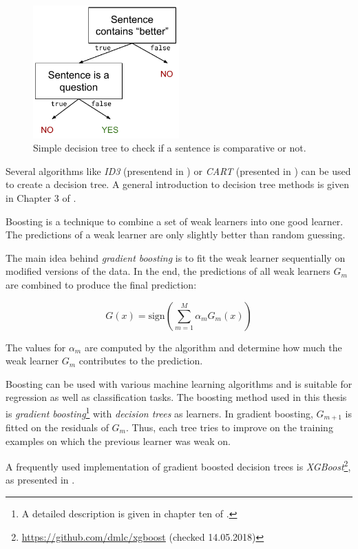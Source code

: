 \begin{figure}[ht]
\centering
	\includegraphics[width=0.5\textwidth]{images/dectree}
	\caption{Simple decision tree to check if a sentence is comparative or not.}
		\label{fig:dectree}
\end{figure}

Several algorithms like \emph{ID3} (presentend in \cite{quinlan1986induction}) or \emph{CART} (presented in \cite{breiman2017classification}) can be used to create a decision tree. A general introduction to decision tree methods is given in Chapter 3 of \cite{mitchell1997machine}.

Boosting is a technique to combine a set of weak learners into one good learner. The predictions of a weak learner are only slightly better than random guessing.

The main idea behind \emph{gradient boosting} is to fit the weak learner sequentially on modified versions of the data. In the end, the predictions of all weak learners \emph{$G_m$} are combined to produce the final prediction:

\[G(x) = \text{sign}\left(\sum^M_{m=1} \alpha_m G_m(x)\right) \]

The values for $\alpha_m$ are computed by the algorithm and determine how much the weak learner \emph{$G_m$} contributes to the prediction.

Boosting can be used with various machine learning algorithms and is suitable for regression as well as classification tasks. The boosting method used in this thesis is \emph{gradient boosting}\footnote{A detailed description is given in chapter ten of \cite{friedman2001elements}.} with \emph{decision trees} as learners. In gradient boosting, \emph{$G_{m+1}$} is fitted on the residuals of \emph{$G_m$}. Thus, each tree tries to improve on the training examples on which the previous learner was weak on.

A frequently used implementation of gradient boosted decision trees is \emph{XGBoost}\footnote{\url{https://github.com/dmlc/xgboost} (checked 14.05.2018)}, as presented in \cite{DBLP:journals/corr/ChenG16}.


